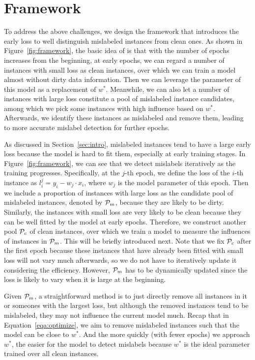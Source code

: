 \section{Framework} 
\label{sec:framework}

To address the above challenges, we design the \sys framework that introduces the early loss to well distinguish mislabeled instances from clean ones. As shown in Figure~\ref{fig:framework}, the basic idea of \sys is that with the number of epochs increases from the beginning, at early epochs, we can regard a number of  instances with small loss as clean instances, over which we  can train a model almost without  dirty data information. Then we can leverage the parameter of this model as a replacement of $w^*$. Meanwhile, we can also let a number of  instances with large  loss constitute  a pool of mislabeled instance candidates, among which we pick some  instances with high influence based on $w^*$. Afterwards, we identify these instances as mislabeled and remove them, leading to more accurate mislabel detection for further epochs. 

 As discussed in Section~\ref{sec:intro},  mislabeled instances tend to have a large early loss because the model is hard to fit them, especially at early training stages. In Figure~\ref{fig:framework}, we can see that we detect mislabels iteratively  as the training progresses.
Specifically, at the  $j$-th  epoch,  we define the loss of the $i$-th instance  as  $l_i^j = y_i - w_j\cdot x_i$, where $w_j$ is the model parameter of this epoch. Then we include a proportion of instances with  large loss as the candidate pool of mislabeled instances, denoted by $\mathcal{P}_m$, because they are likely to be dirty. Similarly, the instances with small loss are very likely to be clean because they can be well fitted by the model at early epochs.  Therefore, we construct another  pool $\mathcal{P}_c$ of clean  instances, over which we train a model to measure the influences of instances in $\mathcal{P}_m$. This will be briefly introduced next. Note that we fix  $\mathcal{P}_c$ after the first epoch because these instances that have already been fitted with small loss will not vary much afterwards, so  we do not have to iteratively update it considering the efficiency. However, $\mathcal{P}_m$ has to be dynamically updated since the loss is likely to vary when it is large at the beginning.


 Given $\mathcal{P}_m$, a straightforward method is to   just directly remove all instances in it or someones with the largest loss, but although the removed instances tend to be mislabeled, they may not influence the current model much. Recap that in Equation~\ref{eqa:optimize},  we aim to remove mislabeled instances such that  the model can be close to $w^*$. And the more quickly (with fewer epochs) we approach  $w^*$, the easier for the model to detect mislabels because $w^*$ is the ideal parameter  trained over all clean instances. 

